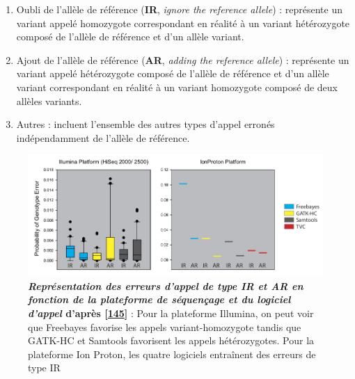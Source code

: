 \documentclass[12pt,a4paper,twoside]{ugathesis}
\theoremstyle{definition}
\theoremstyle{definition}
\theoremstyle{definition}
\theoremstyle{remark}
\begin{document}
\begin{enumerate}
\def\labelenumi{\arabic{enumi}.}
\item
  Oubli de l'allèle de référence (\textbf{IR}, \emph{ignore the
  reference allele}) : représente un variant appelé homozygote
  correspondant en réalité à un variant hétérozygote composé de l'allèle
  de référence et d'un allèle variant.
\item
  Ajout de l'allèle de référence (\textbf{AR}, \emph{adding the
  reference allele}) : représente un variant appelé hétérozygote composé
  de l'allèle de référence et d'un allèle variant correspondant en
  réalité à un variant homozygote composé de deux allèles variants.
\item
  Autres : incluent l'ensemble des autres types d'appel erronés
  indépendamment de l'allèle de référence.
\end{enumerate}

\begin{figure}

{\centering \includegraphics[scale=.37]{figure/snp_error_type} 

}

\caption[Représentation des erreurs d'appel de type IR et AR en fonction de la plateforme de séquençage et du logiciel d'appel]{\textbf{\emph{Représentation des erreurs d'appel de
type IR et AR en fonction de la plateforme de séquençage et du logiciel
d'appel} d'après {[}\protect\hyperlink{ref-Hwang2015}{145}{]}} : Pour la
plateforme Illumina, on peut voir que Freebayes favorise les appels
variant-homozygote tandis que GATK-HC et Samtools favorisent les appels
hétérozygotes. Pour la plateforme Ion Proton, les quatre logiciels
entraînent des erreurs de type IR}\label{fig:pictsnperror}
\end{figure}
\end{document}
